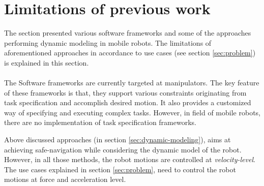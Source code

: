 \section{Limitations of previous work}
The section presented various software frameworks and some of the approaches performing dynamic modeling in mobile robots. The limitations of aforementioned approaches in accordance to use cases (see section \ref{sec:problem}) is explained in this section. 

\paragraph{}The Software frameworks are currently targeted at manipulators. The key feature of these frameworks is that, they support various constraints originating from task specification and accomplish desired motion. It also provides a customized way of specifying and executing complex tasks. However, in field of mobile robots, there are no implementation of task specification frameworks.

Above discussed approaches (in section \ref{sec:dynamic-modeling}), aims at achieving safe-navigation while considering the dynamic model of the robot. However, in all those methods, the robot motions are controlled at \textit{velocity-level}. The use cases explained in section \ref{sec:problem}, need to control the robot motions at force and acceleration level. 



